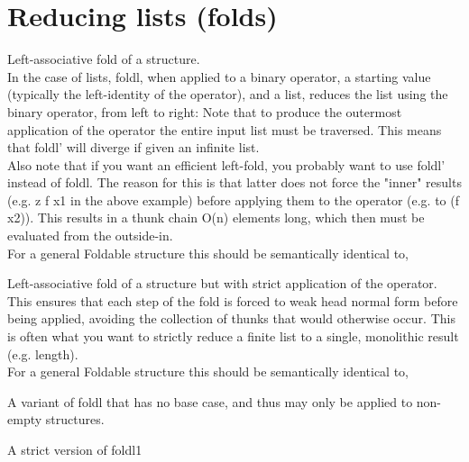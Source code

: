 \section{Reducing lists (folds)}
Left-associative fold of a structure.\\
In the case of lists, foldl, when applied to a binary operator, a starting value (typically the left-identity of the operator), and a list, reduces the list using the binary operator, from left to right:
Note that to produce the outermost application of the operator the entire input list must be traversed. This means that foldl' will diverge if given an infinite list.\\
Also note that if you want an efficient left-fold, you probably want to use foldl' instead of foldl. The reason for this is that latter does not force the "inner" results (e.g. z f x1 in the above example) before applying them to the operator (e.g. to (f x2)). This results in a thunk chain O(n) elements long, which then must be evaluated from the outside-in.\\
For a general Foldable structure this should be semantically identical to,

Left-associative fold of a structure but with strict application of the operator.\\
This ensures that each step of the fold is forced to weak head normal form before being applied, avoiding the collection of thunks that would otherwise occur. This is often what you want to strictly reduce a finite list to a single, monolithic result (e.g. length).\\
For a general Foldable structure this should be semantically identical to,

A variant of foldl that has no base case, and thus may only be applied to non-empty structures.

A strict version of foldl1


